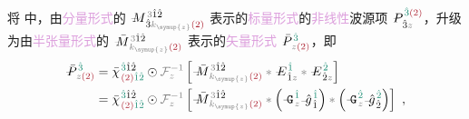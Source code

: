 将  中，由\textcolor{Plum}{分量形式}的 $\Xint{\mathcolor{gray}{-}}{18}{M}^{\;\! \mathcolor{gray}{3} \hat{1} \hat{2} }_{\;\! \hat{3} \mathcolor{gray}{k_{\symup{z}}} \textcolor{Maroon}{(2)} }$ 表示的\textcolor{Plum}{标量形式}的\textcolor{Plum}{非线性}\textcolor{NavyBlue}{波源}项 $\Xint{\mathcolor{gray}{-}}{30}{P}^{\;\! \textcolor{PineGreen}{\hat{3}} \textcolor{Maroon}{(2)} }_{\;\! \hat{3}\mathcolor{gray}{z}}$，升级为由\textcolor{Plum}{半张量形式}的 $\Xint{\mathcolor{gray}{-}}{18}{\bar{M}}^{\;\! \mathcolor{gray}{3} \hat{1} \hat{2} }_{\;\! \mathcolor{gray}{k_{\symup{z}}} \textcolor{Maroon}{(2)} }$ 表示的\textcolor{Plum}{矢量形式} $\Xint{\mathcolor{gray}{-}}{30}{\bar{P}}^{\;\! \textcolor{PineGreen}{\hat{3}} }_{\;\! \mathcolor{gray}{z} \textcolor{Maroon}{(2)} }$，即
\begin{subequations} \label{eq:DP^(2)-3_12-G}
\begin{align}
	\Xint{\mathcolor{gray}{-}}{30}{\bar{P}}^{\;\! \textcolor{PineGreen}{\hat{3}} }_{\;\! \mathcolor{gray}{z}  \textcolor{Maroon}{(2)}} &= \bar{\chi}^{\;\! \textcolor{PineGreen}{\hat{3}} \hat{1} \hat{2} }_{\;\! \textcolor{Maroon}{(2)} \textcolor{PineGreen}{\hat{1} \hat{2}}} \odot \mathcolor{gray}{\mathcal F_{z}^{-1}} \left[ \Xint{\mathcolor{gray}{-}}{18}{\bar{M}}^{\;\! \mathcolor{gray}{3} \hat{1} \hat{2} }_{\;\! \mathcolor{gray}{k_{\symup{z}}} \textcolor{Maroon}{(2)} } \mathcolor{gray}{*} \Xint{\mathcolor{gray}{-}}{295}{E}^{\;\! \textcolor{PineGreen}{\hat{1}}}_{\;\! \hat{1} \mathcolor{gray}{z}} \mathcolor{gray}{*} \Xint{\mathcolor{gray}{-}}{295}{E}^{\;\! \textcolor{PineGreen}{\hat{2}}}_{\;\! \hat{2} \mathcolor{gray}{z}} \right] \label{eq:DP^(2)-3_12-G1} \\
	&= \bar{\chi}^{\;\! \textcolor{PineGreen}{\hat{3}} \hat{1} \hat{2} }_{\;\! \textcolor{Maroon}{(2)} \textcolor{PineGreen}{\hat{1} \hat{2}}} \odot \mathcolor{gray}{\mathcal F_{z}^{-1}} \left[ \Xint{\mathcolor{gray}{-}}{18}{\bar{M}}^{\;\! \mathcolor{gray}{3} \hat{1} \hat{2} }_{\;\! \mathcolor{gray}{k_{\symup{z}}} \textcolor{Maroon}{(2)} } \mathcolor{gray}{*} \left( \Xint{\mathcolor{gray}{-}}{20}{\mathtt{G}}^{\;\! \textcolor{PineGreen}{\hat{1}}}_{\;\! \mathcolor{gray}{z}} \Xint{{}^{}_{\mathcolor{gray}{-}}}{10}{\hat{g}}^{\;\! \textcolor{PineGreen}{\hat{1}}}_{\;\! \hat{1}} \right) \mathcolor{gray}{*} \left( \Xint{\mathcolor{gray}{-}}{20}{\mathtt{G}}^{\;\! \textcolor{PineGreen}{\hat{2}}}_{\;\! \mathcolor{gray}{z}} \Xint{{}^{}_{\mathcolor{gray}{-}}}{10}{\hat{g}}^{\;\! \textcolor{PineGreen}{\hat{2}}}_{\;\! \hat{2}} \right) \right] ~, \label{eq:DP^(2)-3_12-G2}
\end{align}
\end{subequations}
